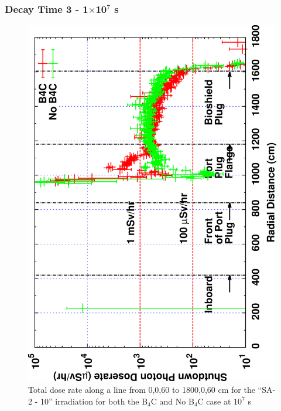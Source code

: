 \documentclass[12pt]{article}
\begin{document}
\subsubsection{Decay Time 3 - 1$\times$10$^{7}$ s}
\begin{figure}[ht!]
\centering
\includegraphics[clip,scale=0.12,angle=-90]{../plots/photon_lineout/comp/5yr_dc3.png}
\caption{Total dose rate along a line from 0,0,60 to 1800,0,60 cm for the ``SA-2 - 10'' irradiation
for both the B$_4$C and No B$_4$C case at $10^7$ s}
\label{fig:photons_5y_dc3_dose}
\end{figure}
\end{document}

